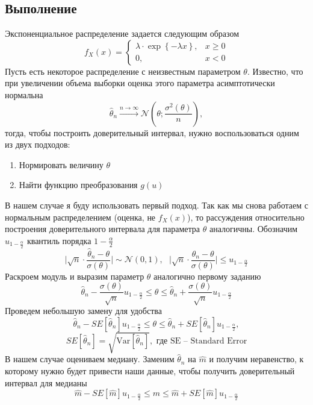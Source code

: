 \documentclass[a4paper, 12pt]{article}
\begin{document}
    \subsection{Выполнение}
    Экспоненциальное распределение задается следующим образом
    $$f_X(x)=
    \begin{cases}
        \lambda\cdot\exp{\left\{-\lambda x\right\}},& x\geq0\\
        0,& x < 0
    \end{cases}$$
    Пусть есть некоторое распределение с неизвестным параметром $\theta$.
    Известно, что при увеличении объема выборки оценка этого параметра асимптотически нормальна
    $$\hat{\theta}_n\xrightarrow{n\to\infty}\mathcal{N}\left(\theta;\dfrac{\sigma^2\left(\theta\right)}{n}\right),$$
    тогда, чтобы построить доверительный интервал, нужно воспользоваться одним из двух подходов:
    \begin{enumerate}
        \item Нормировать величину $\theta$
        \item Найти функцию преобразования $g(u)$
    \end{enumerate}
    В нашем случае я буду использовать первый подход. Так как мы снова работаем с нормальным распределением (оценка, не $f_X(x)$), то рассуждения относительно
    построения доверительного интервала для параметра $\theta$ аналогичны. Обозначим $u_{1-\frac{\alpha}{2}}$ квантиль порядка $1-\frac{\alpha}{2}$
    $$\Bigg|\sqrt{n}\cdot\dfrac{\hat{\theta}_n-\theta}{\sigma\left(\theta\right)}\Bigg|\sim\mathcal{N}\left(0,1\right),\,\,\,\, \Bigg|\sqrt{n}\cdot\dfrac{\hat{\theta}_n-\theta}{\sigma\left(\theta\right)}\Bigg|\leq u_{1-\frac{\alpha}{2}}$$
    Раскроем модуль и выразим параметр $\theta$ аналогично первому заданию
    $$\hat{\theta}_n-\dfrac{\sigma\left(\theta\right)}{\sqrt{n}}u_{1-\frac{\alpha}{2}}\leq\theta\leq\hat{\theta}_n+\dfrac{\sigma\left(\theta\right)}{\sqrt{n}}u_{1-\frac{\alpha}{2}}$$
    Проведем небольшую замену для удобства
    $$\hat{\theta}_n-SE\left[\hat{\theta}_n\right]u_{1-\frac{\alpha}{2}}\leq\theta\leq\hat{\theta}_n+SE\left[\hat{\theta}_n\right]u_{1-\frac{\alpha}{2}},$$
    $$SE\left[\hat{\theta}_n\right]=\sqrt{\text{Var}\left[\hat{\theta}_n\right]},\text{ где SE -- Standard Error}$$
    В нашем случае оцениваем медиану. Заменим $\hat{\theta}_n$ на $\hat{m}$ и получим неравенство, к которому нужно будет привести наши данные, чтобы получить
    доверительный интервал для медианы
    $$\hat{m}-SE\left[\hat{m}\right]u_{1-\frac{\alpha}{2}}\leq m\leq\hat{m}+SE\left[\hat{m}\right]u_{1-\frac{\alpha}{2}}$$
\end{document}
